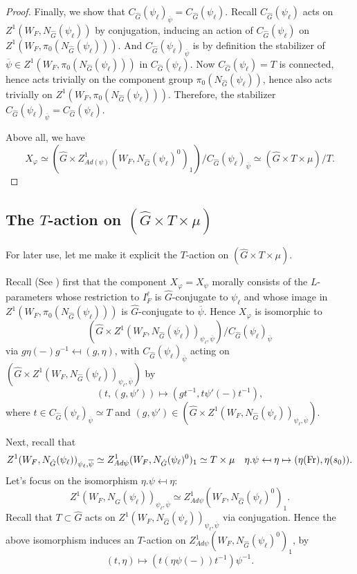 \begin{theorem}
\begin{proof}
    	Finally, we show that $C_{\hat{G}}(\psi_{\ell})_{\overline{\psi}}=C_{\hat{G}}(\psi_{\ell})$. Recall $C_{\hat{G}}(\psi_{\ell})$ acts on $Z^1(W_F, N_{\hat{G}}(\psi_{\ell}))$ by conjugation, inducing an action of $C_{\hat{G}}(\psi_{\ell})$ on $Z^1(W_F, \pi_0(N_{\hat{G}}(\psi_{\ell}))).$ And $C_{\hat{G}}(\psi_{\ell})_{\overline{\psi}}$ is by definition the stabilizer of $\overline{\psi} \in Z^1(W_F, \pi_0(N_{\hat{G}}(\psi_{\ell})))$ in $C_{\hat{G}}(\psi_{\ell})$. Now $C_{\hat{G}}(\psi_{\ell})=T$ is connected, hence acts trivially on the component group $\pi_0(N_{\hat{G}}(\psi_{\ell}))$, hence also acts trivially on $Z^1(W_F, \pi_0(N_{\hat{G}}(\psi_{\ell})))$. Therefore, the stabilizer $C_{\hat{G}}(\psi_{\ell})_{\overline{\psi}}=C_{\hat{G}}(\psi_{\ell})$.
    	
    	Above all, we have 
    	$$X_{\varphi} \simeq (\hat{G} \times Z^1_{Ad(\psi)}(W_F, N_{\hat{G}}(\psi_{\ell})^0)_1)/C_{\hat{G}}(\psi_{\ell})_{\overline{\psi}} \simeq (\hat{G} \times T \times \mu)/T.$$
    \end{proof}
\end{theorem}

\subsection{The $T$-action on $(\hat{G} \times T \times \mu)$}\label{Subsection T-action}

For later use, let me make it explicit the $T$-action on $(\hat{G} \times T \times \mu)$.

Recall (See \cite[Subsection 4.6]{dat2022ihes}) first that the component $X_{\varphi}=X_{\psi}$ morally consists of the $L$-parameters whose restriction to $I_F^{\ell}$ is $\hat{G}$-conjugate to $\psi_{\ell}$ and whose image in $Z^1(W_F, \pi_0(N_{\hat{G}}(\psi_{\ell})))$ is $\hat{G}$-conjugate to $\overline{\psi}$. Hence $X_{\varphi}$ is isomorphic to 
$$(\hat{G} \times Z^1(W_F, N_{\hat{G}}(\psi_{\ell}))_{\psi_{\ell}, \overline{\psi}})/C_{\hat{G}}(\psi_{\ell})_{\overline{\psi}}$$
via $g\eta(-)g^{-1} \mapsfrom (g, \eta)$, with $C_{\hat{G}}(\psi_{\ell})_{\overline{\psi}}$ acting on $(\hat{G} \times Z^1(W_F, N_{\hat{G}}(\psi_{\ell}))_{\psi_{\ell}, \overline{\psi}})$ by 
$$(t, (g, \psi')) \mapsto (gt^{-1}, t\psi'(-)t^{-1}),$$
where $t \in C_{\hat{G}}(\psi_{\ell})_{\overline{\psi}} \simeq T$ and $(g, \psi') \in (\hat{G} \times Z^1(W_F, N_{\hat{G}}(\psi_{\ell}))_{\psi_{\ell}, \overline{\psi}})$.

Next, recall that 
$$Z^1(W_F, N_{\hat{G}}(\psi_{\ell}))_{\psi_{\ell}, \overline{\psi}} \simeq Z^1_{Ad\psi}(W_F, N_{\hat{G}}(\psi_{\ell})^0)_1 \simeq T \times \mu \quad \eta.\psi \mapsfrom \eta \mapsto (\eta(\operatorname{Fr}), \eta(s_0)).$$
Let's focus on the isomorphism $\eta.\psi \mapsfrom \eta$:
$$Z^1(W_F, N_{\hat{G}}(\psi_{\ell}))_{\psi_{\ell}, \overline{\psi}} \simeq Z^1_{Ad\psi}(W_F, N_{\hat{G}}(\psi_{\ell})^0)_1.$$
Recall that $T \subset \hat{G}$ acts on $Z^1(W_F, N_{\hat{G}}(\psi_{\ell}))_{\psi_{\ell}, \overline{\psi}}$ via conjugation. Hence the above isomorphism induces an $T$-action on $Z^1_{Ad\psi}(W_F, N_{\hat{G}}(\psi_{\ell})^0)_1$, by
$$(t, \eta) \mapsto (t(\eta\psi(-)) t^{-1})\psi^{-1}.$$


